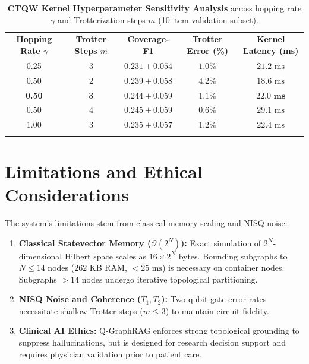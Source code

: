 \documentclass{llncs}
\begin{document}
\begin{table}[t]
\centering
\small
\caption{\textbf{CTQW Kernel Hyperparameter Sensitivity Analysis} across hopping rate $\gamma$ and Trotterization steps $m$ (10-item validation subset).}
\label{tab:sensitivity_analysis}
\begin{tabular}{ccccc}
\hline\noalign{\smallskip}
\textbf{Hopping Rate $\gamma$} & \textbf{Trotter Steps $m$} & \textbf{Coverage-F1} & \textbf{Trotter Error (\%)} & \textbf{Kernel Latency (ms)} \\
\noalign{\smallskip}\hline\noalign{\smallskip}
0.25 & 3 & $0.231 \pm 0.054$ & $1.0\%$ & $21.2\text{ ms}$ \\
0.50 & 2 & $0.239 \pm 0.058$ & $4.2\%$ & $18.6\text{ ms}$ \\
\textbf{0.50} & \textbf{3} & $\mathbf{0.244 \pm 0.059}$ & $\mathbf{1.1\%}$ & $\mathbf{22.0\text{ ms}}$ \\
0.50 & 4 & $0.245 \pm 0.059$ & $0.6\%$ & $29.1\text{ ms}$ \\
1.00 & 3 & $0.235 \pm 0.057$ & $1.2\%$ & $22.4\text{ ms}$ \\
\noalign{\smallskip}\hline
\end{tabular}
\end{table}

\section{Limitations and Ethical Considerations}\label{sec:limitations}

The system's limitations stem from classical memory scaling and NISQ noise:
\begin{enumerate}
    \item \textbf{Classical Statevector Memory ($\mathcal{O}(2^N)$):} Exact simulation of $2^N$-dimensional Hilbert space scales as $16 \times 2^N$ bytes. Bounding subgraphs to $N \le 14$ nodes ($262\text{ KB}$ RAM, $<25\text{ ms}$) is necessary on container nodes. Subgraphs $>14$ nodes undergo iterative topological partitioning.
    \item \textbf{NISQ Noise and Coherence ($T_1, T_2$):} Two-qubit gate error rates necessitate shallow Trotter steps ($m \le 3$) to maintain circuit fidelity.
    \item \textbf{Clinical AI Ethics:} Q-GraphRAG enforces strong topological grounding to suppress hallucinations, but is designed for research decision support and requires physician validation prior to patient care.
\end{enumerate}
\end{document}
